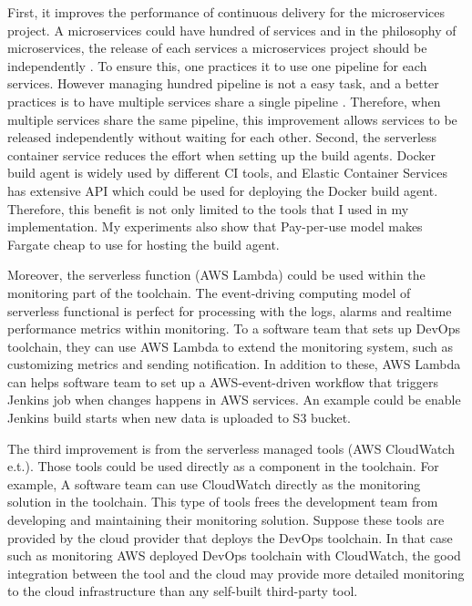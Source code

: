 First, it improves the performance of continuous delivery for the microservices project. A microservices could have hundred of services and in the philosophy of microservices, the release of each services a microservices project should be independently \cite{dehghani2018break}. To ensure this, one practices it to use one pipeline for each services. However managing hundred pipeline is not a easy task, and a better practices is to have multiple services share a single pipeline \cite{HowtoSca9:online}. Therefore, when multiple services share the same pipeline, this improvement allows services to be released independently without waiting for each other.
Second, the serverless container service reduces the effort when setting up the build agents. Docker build agent is widely used by different CI tools, and Elastic Container Services has extensive API which could be used for deploying the Docker build agent. Therefore, this benefit is not only limited to the tools that I used in my implementation. My experiments also show that Pay-per-use model makes Fargate cheap to use for hosting the build agent.
\par
Moreover, the serverless function (AWS Lambda) could be used within the monitoring part of the toolchain. The event-driving computing model of serverless functional is perfect for processing with the logs, alarms and realtime performance metrics within monitoring. To a software team that sets up DevOps toolchain, they can use AWS Lambda to extend the monitoring system, such as customizing metrics and sending notification. In addition to these, AWS Lambda can helps software team to set up a AWS-event-driven workflow that triggers Jenkins job when changes happens in AWS services. An example could be enable Jenkins build starts when new data is uploaded to S3 bucket.
\par
The third improvement is from the serverless managed tools (AWS CloudWatch e.t.). Those tools could be used directly as a component in the toolchain. For example, A software team can use CloudWatch directly as the monitoring solution in the toolchain. This type of tools frees the development team from developing and maintaining their monitoring solution. Suppose these tools are provided by the cloud provider that deploys the DevOps toolchain. In that case such as monitoring AWS deployed DevOps toolchain with CloudWatch, the good integration between the tool and the cloud may provide more detailed monitoring to the cloud infrastructure than any self-built third-party tool.
\par
